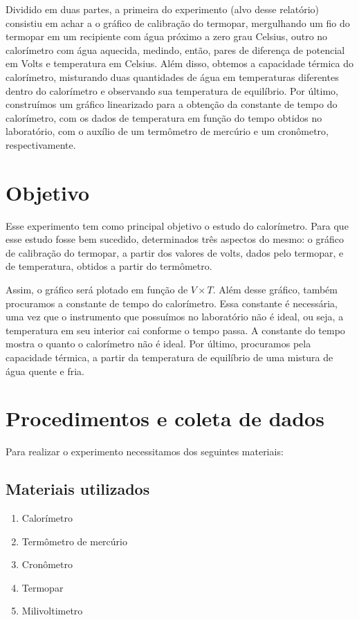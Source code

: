 \documentclass[a4paper]{article}
\begin{document}
Dividido em duas partes, a primeira do experimento (alvo desse relatório) consistiu em achar a o gráfico de calibração do termopar, mergulhando um fio do termopar em um recipiente com água próximo a zero grau Celsius, outro no calorímetro com água aquecida, medindo, então, pares de diferença de potencial em Volts e temperatura em Celsius. Além disso, obtemos a capacidade térmica do calorímetro, misturando duas quantidades de água em temperaturas diferentes dentro do calorímetro e observando sua temperatura de equilíbrio. Por último, construímos um gráfico linearizado para a obtenção da constante de tempo do calorímetro, com os dados de temperatura em função do tempo obtidos no laboratório, com o auxílio de um termômetro de mercúrio e um cronômetro, respectivamente.

\section{Objetivo}
	Esse experimento tem como principal objetivo o estudo do calorímetro. Para que esse estudo fosse bem sucedido, determinados três aspectos do mesmo: o gráfico de calibração do termopar, a partir dos valores de volts, dados pelo termopar, e de temperatura, obtidos a partir do termômetro. 

Assim, o gráfico será plotado em função de $V \times T$. Além desse gráfico, também procuramos a constante de tempo do calorímetro. Essa constante é necessária, uma vez que o instrumento que possuímos no laboratório não é ideal, ou seja, a temperatura em seu interior cai conforme o tempo passa. A constante do tempo mostra o quanto o calorímetro não é ideal. Por último, procuramos pela capacidade térmica, a partir da temperatura de equilíbrio de uma mistura de água quente e fria.
	
\section{Procedimentos e coleta de dados}
	Para realizar o experimento necessitamos dos seguintes materiais:
	\subsection{Materiais utilizados}
		\begin{enumerate}
			\item Calorímetro
			\item Termômetro de mercúrio
			\item Cronômetro
			\item Termopar
			\item Milivoltimetro
		\end{enumerate}
\end{document}
